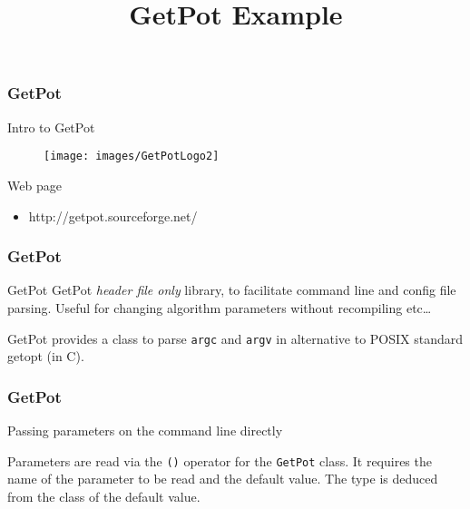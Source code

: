 \documentclass[smaller,a4paper]{beamer}
\begin{document}
\title{GetPot Example}
\frame{\titlepage}

\begin{frame}

    \frametitle{GetPot}

    \begin{block}{Intro to}
        \centering
        GetPot
    \end{block}

    \begin{figure}
        \centering
        \texttt{[image: images/GetPotLogo2]}
    \end{figure}

    \begin{block}{Web page}
        \centering
        \begin{itemize}
            \item http://getpot.sourceforge.net/
        \end{itemize}
    \end{block}

\end{frame}


\begin{frame}

    \frametitle{GetPot}

    \begin{block}{GetPot}
        GetPot \emph{header file only} library,
        to facilitate command line and config file parsing.
        Useful for changing algorithm parameters without recompiling
         etc\ldots
    \end{block}

    \vspace{.2cm}

    \begin{block}{ }
        GetPot provides a class to parse \texttt{argc} and \texttt{argv} in alternative to POSIX standard getopt (in C).
    \end{block}

\end{frame}


\begin{frame}[fragile]

    \frametitle{GetPot}

    \begin{block}{Passing parameters on the command line directly}
        \lstset{basicstyle=\scriptsize\sf}
            
        \lstset{basicstyle=\sf}
    \end{block}

    \vspace{.2cm}

    \begin{block}{ }
    Parameters are read via the \texttt{()} operator for the \texttt{GetPot} class.
    It requires the name of the parameter to be read and the default value.
    The type is deduced from the class of the default value.
    \end{block}

\end{frame}
\end{document}
